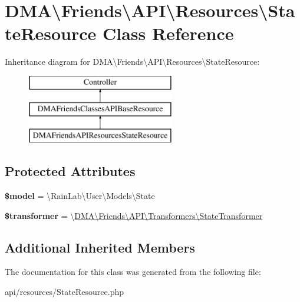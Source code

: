 \hypertarget{classDMA_1_1Friends_1_1API_1_1Resources_1_1StateResource}{}\section{D\+M\+A\textbackslash{}Friends\textbackslash{}A\+P\+I\textbackslash{}Resources\textbackslash{}State\+Resource Class Reference}
\label{classDMA_1_1Friends_1_1API_1_1Resources_1_1StateResource}
Inheritance diagram for D\+M\+A\textbackslash{}Friends\textbackslash{}A\+P\+I\textbackslash{}Resources\textbackslash{}State\+Resource\+:\begin{figure}[H]
\begin{center}
\leavevmode
\includegraphics[height=3.000000cm]{d7/db1/classDMA_1_1Friends_1_1API_1_1Resources_1_1StateResource}
\end{center}
\end{figure}
\subsection*{Protected Attributes}
\begin{DoxyCompactItemize}
\item 
\hypertarget{classDMA_1_1Friends_1_1API_1_1Resources_1_1StateResource_ab08f69284fc360f2f6760197bed4259b}{}{\bfseries \$model} = \textquotesingle{}\textbackslash{}Rain\+Lab\textbackslash{}\+User\textbackslash{}\+Models\textbackslash{}\+State\textquotesingle{}\label{classDMA_1_1Friends_1_1API_1_1Resources_1_1StateResource_ab08f69284fc360f2f6760197bed4259b}

\item 
\hypertarget{classDMA_1_1Friends_1_1API_1_1Resources_1_1StateResource_aa01cabe5cde83c9b4ef6c4bb836b496f}{}{\bfseries \$transformer} = \textquotesingle{}\textbackslash{}\hyperlink{classDMA_1_1Friends_1_1API_1_1Transformers_1_1StateTransformer}{D\+M\+A\textbackslash{}\+Friends\textbackslash{}\+A\+P\+I\textbackslash{}\+Transformers\textbackslash{}\+State\+Transformer}\textquotesingle{}\label{classDMA_1_1Friends_1_1API_1_1Resources_1_1StateResource_aa01cabe5cde83c9b4ef6c4bb836b496f}

\end{DoxyCompactItemize}
\subsection*{Additional Inherited Members}


The documentation for this class was generated from the following file\+:\begin{DoxyCompactItemize}
\item 
api/resources/State\+Resource.\+php\end{DoxyCompactItemize}
